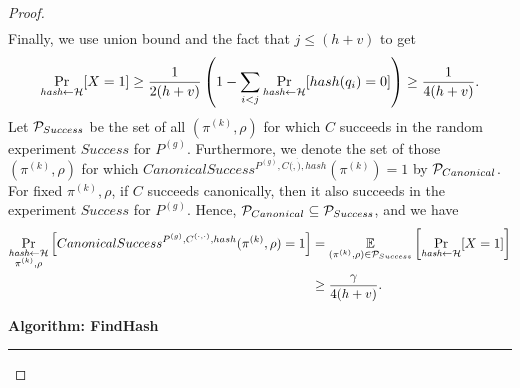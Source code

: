 \begin{proof}
\begin{align*}
\end{align*}
Finally, we use union bound and the fact that $j \leq (h+v)$ to get
\begin{align*}
\underset{\textit{hash} \leftarrow \mathcal{H}}{\Pr}[X=1] \geq
\frac{1}{2(h+v)} \left( 1 - \sum_{i < j} \underset{\textit{hash} \leftarrow \mathcal{H}}{\Pr}[hash(q_i) = 0] \right) \geq \frac{1}{4(h+v)}.
\end{align*}
Let $\mathcal{P}_{Success}$ be the set of all $(\pi^{(k)},\rho)$ for which $C$ succeeds in the random experiment $Success$ for $P^{(g)}$. Furthermore,
we denote the set of those $(\pi^{(k)},\rho)$ for which $CanonicalSuccess^{P^{(g)}, C(\dot, \dot), hash}(\pi^{(k)}) = 1$ by $\mathcal{P}_{Canonical}$.
For fixed $\pi^{(k)}, \rho$, if $C$ succeeds canonically, then it also succeeds in the experiment $Success$ for $P^{(g)}$.
Hence, $\mathcal{P}_{Canonical} \subseteq \mathcal{P}_{Success}$, and we have
\begin{align}
  \label{ineq:hash_high_prob}
\underset{\substack{\textit{hash} \leftarrow \mathcal{H} \\ \pi^{(k)}, \rho}}{\Pr}\left[CanonicalSuccess^{P^{(g)}, C^{(\cdot, \cdot)}, hash}(\pi^{(k)}, \rho) = 1\right] &=
\underset{{(\pi^{(k)},\rho) \in \mathcal{P}_{Success}}}{\mathbb{E}}\left[\underset{\substack{\textit{hash} \leftarrow \mathcal{H}}}{\Pr}[X = 1]\right] \notag\\
&\geq \frac{\gamma}{4(h+v)}.
\end{align}
%
\begin{codeblock}
  \textbf{Algorithm: FindHash}
  \medskip
  \hrule
  \medskip


\end{codeblock}
\end{proof}
